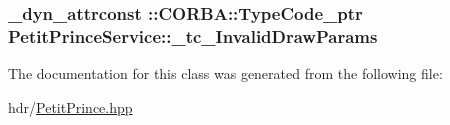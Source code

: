 \subsubsection[{\texorpdfstring{\+\_\+tc\+\_\+\+Invalid\+Draw\+Params}{_tc_InvalidDrawParams}}]{\setlength{\rightskip}{0pt plus 5cm}\+\_\+dyn\+\_\+attrconst \+::C\+O\+R\+B\+A\+::\+Type\+Code\+\_\+ptr Petit\+Prince\+Service\+::\+\_\+tc\+\_\+\+Invalid\+Draw\+Params\hspace{0.3cm}{\ttfamily [static]}}\hypertarget{class_petit_prince_service_af8862791a82a5037ffebad7ab9096817}{}\label{class_petit_prince_service_af8862791a82a5037ffebad7ab9096817}


The documentation for this class was generated from the following file\+:\begin{DoxyCompactItemize}
\item 
hdr/\hyperlink{_petit_prince_8hpp}{Petit\+Prince.\+hpp}\end{DoxyCompactItemize}
